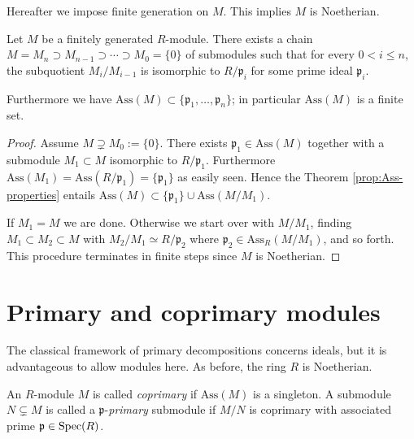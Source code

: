 Hereafter we impose finite generation on $M$. This implies $M$ is Noetherian.
\begin{theorem}
	Let $M$ be a finitely generated $R$-module. There exists a chain $M = M_n \supset M_{n-1} \supset \cdots \supset M_0 = \{0\}$ of submodules such that for every $0 < i \leq n$, the subquotient $M_i/M_{i-1}$ is isomorphic to $R/\mathfrak{p}_i$ for some prime ideal $\mathfrak{p}_i$.
	
	Furthermore we have $\mathrm{Ass}(M) \subset \{\mathfrak{p}_1, \ldots, \mathfrak{p}_n \}$; in particular $\mathrm{Ass}(M)$ is a finite set.
\end{theorem}
\begin{proof}
	Assume $M \supsetneq M_0 := \{0\}$. There exists $\mathfrak{p}_1 \in \text{Ass}(M)$ together with a submodule $M_1 \subset M$ isomorphic to $R/\mathfrak{p}_1$. Furthermore $\text{Ass}(M_1) = \text{Ass}(R/\mathfrak{p}_1) = \{ \mathfrak{p}_1\}$ as easily seen. Hence the Theorem \ref{prop:Ass-properties} entails $\text{Ass}(M) \subset \{\mathfrak{p}_1\} \cup \text{Ass}(M/M_1)$.

	If $M_1 = M$ we are done. Otherwise we start over with $M/M_1$, finding $M_1 \subset M_2 \subset M$ with $M_2/M_1 \simeq R/\mathfrak{p}_2$ where $\mathfrak{p}_2 \in \text{Ass}_R(M/M_1)$, and so forth. This procedure terminates in finite steps since $M$ is Noetherian.
\end{proof}

\section{Primary and coprimary modules}
The classical framework of primary decompositions concerns ideals, but it is advantageous to allow modules here. As before, the ring $R$ is Noetherian.

\begin{definition}
	An $R$-module $M$ is called \emph{coprimary} if $\text{Ass}(M)$ is a singleton. A submodule $N \subsetneq M$ is called a $\mathfrak{p}$-\emph{primary} submodule if $M/N$ is coprimary with associated prime $\mathfrak{p} \in \operatorname{Spec}(R)$.
\end{definition}

